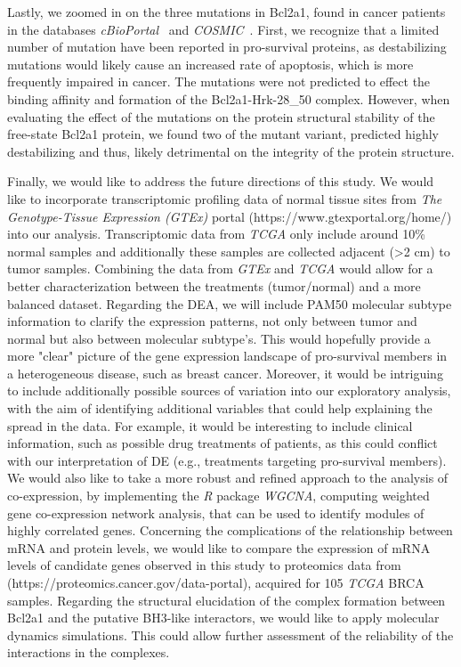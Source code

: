 \documentclass[10pt,letterpaper]{article}
\begin{document}
Lastly, we zoomed in on the three mutations in Bcl2a1, found in cancer patients in the databases \textit{cBioPortal}~\cite{Cerami2012} and \textit{COSMIC}~\cite{Forbes2017}. First, we recognize that a limited number of mutation have been reported in pro-survival proteins, as destabilizing mutations would likely cause an increased rate of apoptosis, which is more frequently impaired in cancer.
The mutations were not predicted to effect the binding affinity and formation of the Bcl2a1-Hrk-28\_50 complex. However, when evaluating the effect of the mutations on the protein structural stability of the free-state Bcl2a1 protein, we found two of the mutant variant, predicted highly destabilizing and thus, likely detrimental on the integrity of the protein structure.

Finally, we would like to address the future directions of this study. We would like to incorporate transcriptomic profiling data of normal tissue sites from \textit{The Genotype-Tissue Expression (GTEx)} portal (https://www.gtexportal.org/home/) into our analysis. Transcriptomic data from \textit{TCGA} only include around 10\% normal samples and additionally these samples are collected adjacent (\textgreater2 cm) to tumor samples. Combining the data from \textit{GTEx} and \textit{TCGA} would allow for a better characterization between the treatments (tumor/normal) and a more balanced dataset. Regarding the DEA, we will include PAM50 molecular subtype information to clarify the expression patterns, not only between tumor and normal but also between molecular subtype's. This would hopefully provide a more "clear" picture of the gene expression landscape of pro-survival members in a heterogeneous disease, such as breast cancer. Moreover, it would be intriguing to include additionally possible sources of variation into our exploratory analysis, with the aim of identifying additional variables that could help explaining the spread in the data. For example, it would be interesting to include clinical information, such as possible drug treatments of patients, as this could conflict with our interpretation of DE (e.g., treatments targeting pro-survival members).
We would also like to take a more robust and refined approach to the analysis of co-expression, by implementing the \textit{R} package \textit{WGCNA}, computing weighted gene co-expression network analysis, that can be used to identify modules of highly correlated genes. Concerning the complications of the relationship between mRNA and protein levels, we would like to compare the expression of mRNA levels of candidate genes observed in this study to proteomics data from  (https://proteomics.cancer.gov/data-portal), acquired for 105 \textit{TCGA} BRCA samples. Regarding the structural elucidation of the complex formation between Bcl2a1 and the putative BH3-like interactors, we would like to apply molecular dynamics simulations. This could allow further assessment of the reliability of the interactions in the complexes.   
\end{document}
